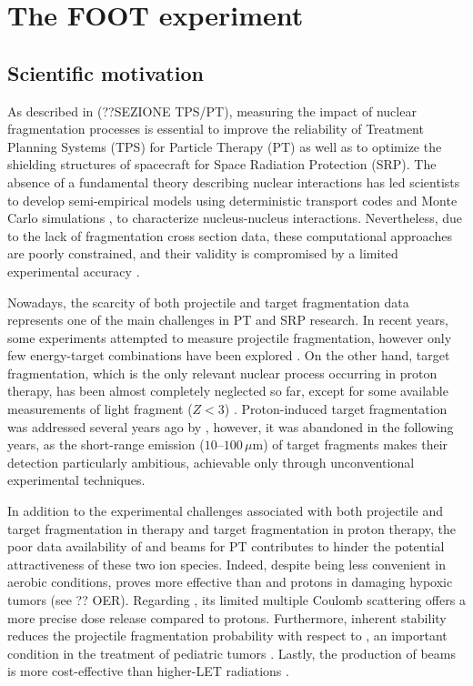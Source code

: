 \chapter{The FOOT experiment}\label{ch:foot_experiment}
\section{Scientific motivation}\label{sec:foot_motivation}
As described in (??SEZIONE TPS/PT), measuring the impact of nuclear fragmentation processes is essential to improve the reliability of Treatment Planning Systems (TPS) for Particle Therapy (PT) as well as to optimize the shielding structures of spacecraft for Space Radiation Protection (SRP). The absence of a fundamental theory describing nuclear interactions has led scientists to develop semi-empirical models using deterministic transport codes and Monte Carlo simulations \cite{Kramer2010,Sommerer_2006,Sato2009-db,Bohlen2010-em,Bolst2017-db}, to characterize nucleus-nucleus interactions. Nevertheless, due to the lack of fragmentation cross section data, these computational approaches are poorly constrained, and their validity is compromised by a limited experimental accuracy \cite{measurement_impact_foot}.

Nowadays, the scarcity of both projectile and target fragmentation data represents one of the main challenges in PT and SRP research. In recent years, some experiments attempted to measure  projectile fragmentation, however only few energy-target combinations have been explored \cite{DeNapoli_2012,PhysRevC.89.064615,PhysRevC.93.064601}. On the other hand, target fragmentation, which is the only relevant nuclear process occurring in proton therapy, has been almost completely neglected so far, except for some available measurements of light fragment ($Z<3$) \cite{foot_cdr}. Proton-induced target fragmentation was addressed several years ago by \cite{articleLETPainting}, however, it was abandoned in the following years, as the short-range emission ($10$--$100\,\mu\mathrm{m}$) of target fragments makes their detection particularly ambitious, achievable only through unconventional experimental techniques.

In addition to the experimental challenges associated with both projectile and target fragmentation in  therapy and target fragmentation in proton therapy, the poor data availability of  and  beams for PT \cite{Tommasino2016-af} contributes to hinder the potential attractiveness of these two ion species. Indeed, despite being less convenient in aerobic conditions,  proves more effective than  and protons in damaging hypoxic tumors (see ?? OER). Regarding , its limited multiple Coulomb scattering offers a more precise dose release compared to protons. Furthermore,  inherent stability reduces the projectile fragmentation probability with respect to , an important condition in the treatment of pediatric tumors \cite{articleIndelicato}. Lastly, the production of  beams is more cost-effective than higher-LET radiations \cite{Marafini_2017,Rovituso_2017}.
